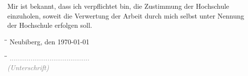 Mir ist bekannt, dass ich verpflichtet bin, die Zustimmung der Hochschule einzuholen, soweit die Verwertung der Arbeit durch mich selbst unter Nennung der Hochschule erfolgen soll.

\begin{tabbing}
  \hspace*{10cm} \= \hspace*{5cm}\= \kill
  Neubiberg, den \today{} \>
\end{tabbing}

\vspace{-1.5cm}

\begin{tabbing}
  \hspace*{10cm} \= \hspace*{5cm}\= \kill
  \> \textcolor{gray}{..........................................}\\	
  \> \textcolor{gray}{\textit{(Unterschrift)}}
\end{tabbing}